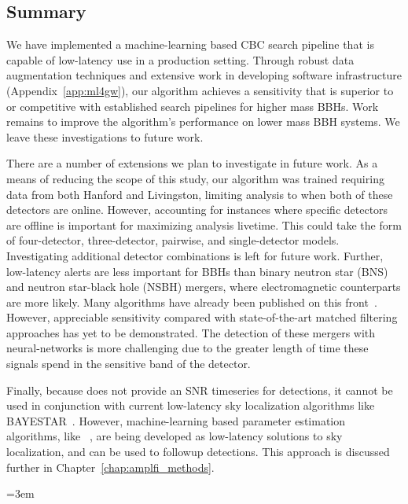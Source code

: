 \begin{refsection}
\section{Summary}
We have implemented a machine-learning based CBC search pipeline that is capable of low-latency use in a production setting. 
Through robust data augmentation techniques and extensive work in developing software infrastructure (Appendix~\ref{app:ml4gw}), our algorithm achieves a sensitivity that is superior to or competitive with established search pipelines for higher mass BBHs. 
Work remains to improve the algorithm's performance on lower mass BBH systems. 
We leave these investigations to future work.

There are a number of extensions we plan to investigate in future work. 
As a means of reducing the scope of this study, our algorithm was trained requiring data from both Hanford and Livingston, limiting analysis to when both of these detectors are online. 
However, accounting for instances where specific detectors are offline is important for maximizing analysis livetime. 
This could take the form of four-detector, three-detector, pairwise, and single-detector models. 
Investigating additional detector combinations is left for future work.
Further, low-latency alerts are less important for BBHs than binary neutron star (BNS) and neutron star-black hole (NSBH) mergers, where electromagnetic counterparts are more likely. 
Many algorithms have already been published on this front~\cite{Lin_2019, PhysRevD.102.063015, KRASTEV2020135330, Aveiro_2022, Qiu_2023}. 
However, appreciable sensitivity compared with state-of-the-art matched filtering approaches has yet to be demonstrated.
The detection of these mergers with neural-networks is more challenging due to the greater length of time these signals spend in the sensitive band of the detector.

Finally, because \aframe does not provide an SNR timeseries for detections, it cannot be used in conjunction with current low-latency sky localization algorithms like BAYESTAR~\cite{Singer_2016}. 
However, machine-learning based parameter estimation algorithms, like \amplfi~\cite{amplfi}, are being developed as low-latency solutions to sky localization, and can be used to followup \aframe detections.
This approach is discussed further in Chapter~\ref{chap:amplfi_methods}.

\singlespacing
\begingroup
\emergencystretch=3em
\printbibliography[title=References,heading=subbibintoc]
\endgroup
\end{refsection}


